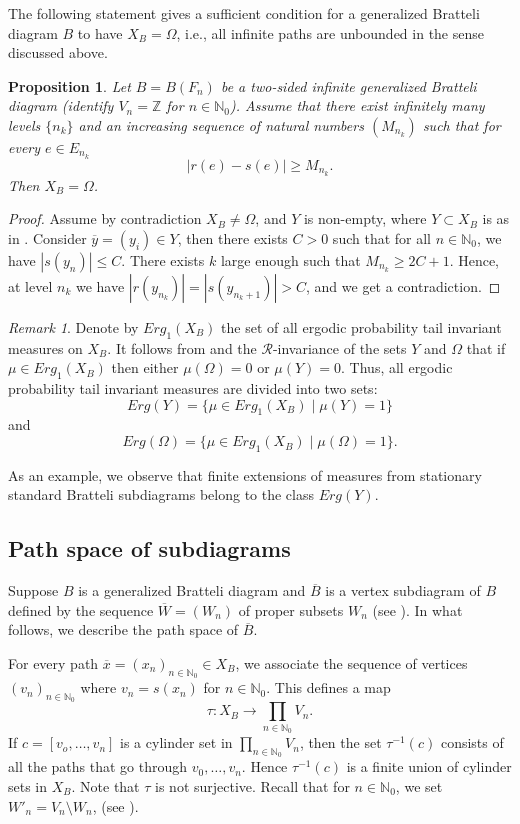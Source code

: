 \documentclass[11pt,reqno]{amsart}
\theoremstyle{definition}
\theoremstyle{remark}
\newtheorem{remark}[definition]{Remark}
\theoremstyle{plain}
\newtheorem{prop}[definition]{Proposition}
\def\ol{\overline}
\def\ov{\overline}
\newcommand{\N}{\mathbb N}
\newcommand{\Z}{\mathbb Z}
\newcommand{\Om}{\Omega}
\numberwithin{equation}{section}
\begin{document}
The following statement gives a sufficient condition for a generalized Bratteli diagram $B$ to have $X_B = \Omega$, i.e., all infinite paths are unbounded in the sense discussed above.

\begin{prop} Let $B = B(F_n)$ be a two-sided infinite generalized Bratteli diagram (identify $V_n = \Z$ for $n\in \N_0$). Assume that there exist infinitely many levels $\{n_k\}$ and an increasing sequence of natural numbers $(M_{n_k})$ such that for every $e \in E_{n_k}$  
$$
|r(e) - s(e)| \geq M_{n_k}.
$$
    Then $X_B = \Omega$.
\end{prop}

\begin{proof} Assume by contradiction $X_B \neq \Omega$, and $Y$ is non-empty, where $Y \subset X_B$ is as in . Consider $\ov y = (y_i) \in Y$, then there exists $C > 0$ such that for all $n \in \mathbb{N}_0$, we have $| s(y_n) |\leq C$. There exists $k$ large enough such that $M_{n_k} \geq 2C + 1$. Hence, at level $n_k$ we have $|r(y_{n_k})| = |s(y_{n_k+1})| > C$, and we get a contradiction.
\end{proof}


\begin{remark}
 Denote by $Erg_1(X_B)$ the set of all ergodic probability tail invariant measures on $X_B$.
It follows from  and the $\mathcal{R}$-invariance of the sets $Y$ and $\Om$ that if $\mu \in Erg_1(X_B)$ then either $\mu(\Omega) = 0$ or $\mu(Y) = 0$. Thus, all ergodic probability tail invariant measures are divided into two sets: 
$$
Erg(Y) = \{\mu \in Erg_1(X_B) \; | \; \mu(Y) = 1\}
$$ 
and 
$$
Erg (\Om) = \{\mu \in Erg_1(X_B) \; | \; \mu(\Omega) = 1\}.
$$

As an example, we observe that finite extensions of measures from stationary standard Bratteli subdiagrams belong to the class $Erg(Y)$. 
\end{remark}

\subsection{Path space of subdiagrams}
Suppose $B$ is a generalized Bratteli diagram and $\ol B$ is a vertex subdiagram of $B$ defined by the sequence $\ol W= (W_n)$ of proper subsets $W_n$ (see ). In what follows, we describe the path space of $\ol B$.

For every path $\ol x = (x_n)_{n \in \N_0} \in X_B$, we associate the sequence of vertices $(v_n)_{n \in \N_0}$ where $v_n = s(x_n)$ for $n \in \N_0$. This defines a map
$$
\tau : X_B \to \prod_{n \in \N_0} V_n. 
$$
If $c= [v_o, \ldots ,v_n]$ is a cylinder set in $\prod_{n \in \N_0} V_n$,
then the set $\tau^{-1}(c)$ consists of all the paths that go through 
$v_0, \ldots, v_n$. Hence $\tau^{-1}(c)$ is a finite union of cylinder sets in $X_B$. Note that $\tau$ is not surjective. Recall that for $n \in \N_0$, we set $W'_n = V_n \setminus W_n$, (see ).
\end{document}
